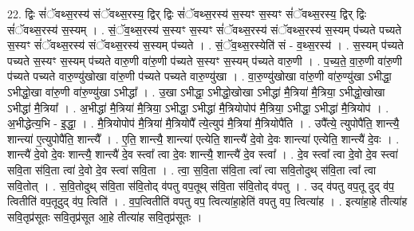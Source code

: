 \documentclass[17pt]{extarticle}
\begin{document}
22. द्विः सं॑ॅवथ्स॒रस्य॑ संॅवथ्स॒रस्य॒ द्विर् द्विः सं॑ॅवथ्स॒रस्य॑ स॒स्यꣳ स॒स्यꣳ सं॑ॅवथ्स॒रस्य॒ द्विर् द्विः सं॑ॅवथ्स॒रस्य॑ स॒स्यम् । . सं॒ॅव॒थ्स॒रस्य॑ स॒स्यꣳ स॒स्यꣳ सं॑ॅवथ्स॒रस्य॑ संॅवथ्स॒रस्य॑ स॒स्यम् प॑च्यते पच्यते स॒स्यꣳ सं॑ॅवथ्स॒रस्य॑ संॅवथ्स॒रस्य॑ स॒स्यम् प॑च्यते । . सं॒ॅव॒थ्स॒रस्येति॑ सं - व॒थ्स॒रस्य॑ । . स॒स्यम् प॑च्यते पच्यते स॒स्यꣳ स॒स्यम् प॑च्यते वारु॒णी वा॑रु॒णी प॑च्यते स॒स्यꣳ स॒स्यम् प॑च्यते वारु॒णी । . प॒च्य॒ते॒ वा॒रु॒णी वा॑रु॒णी प॑च्यते पच्यते वारु॒ण्यु॑खोखा वा॑रु॒णी प॑च्यते पच्यते वारु॒ण्यु॑खा । . वा॒रु॒ण्यु॑खोखा वा॑रु॒णी वा॑रु॒ण्यु॑खा ऽभीद्धा॒ ऽभीद्धो॒खा वा॑रु॒णी वा॑रु॒ण्यु॑खा ऽभीद्धा᳚ । . उ॒खा ऽभीद्धा॒ ऽभीद्धो॒खोखा ऽभीद्धा॑ मै॒त्रिया॑ मै॒त्रिया॒ ऽभीद्धो॒खोखा ऽभीद्धा॑ मै॒त्रिया᳚ । . अ॒भीद्धा॑ मै॒त्रिया॑ मै॒त्रिया॒ ऽभीद्धा॒ ऽभीद्धा॑ मै॒त्रियोपोप॑ मै॒त्रिया॒ ऽभीद्धा॒ ऽभीद्धा॑ मै॒त्रियोप॑ । . अ॒भीद्धेत्य॒भि - इ॒द्धा॒ । . मै॒त्रियोपोप॑ मै॒त्रिया॑ मै॒त्रियोपै᳚ त्ये॒त्युप॑ मै॒त्रिया॑ मै॒त्रियोपै॑ति । . उपै᳚त्ये॒ त्युपोपै॑ति॒ शान्त्यै॒ शान्त्या॑ ए॒त्युपोपै॑ति॒ शान्त्यै᳚ । . ए॒ति॒ शान्त्यै॒ शान्त्या॑ एत्येति॒ शान्त्यै॑ दे॒वो दे॒वः शान्त्या॑ एत्येति॒ शान्त्यै॑ दे॒वः । . शान्त्यै॑ दे॒वो दे॒वः शान्त्यै॒ शान्त्यै॑ दे॒व स्त्वा᳚ त्वा दे॒वः शान्त्यै॒ शान्त्यै॑ दे॒व स्त्वा᳚ । . दे॒व स्त्वा᳚ त्वा दे॒वो दे॒व स्त्वा॑ सवि॒ता स॑वि॒ता त्वा॑ दे॒वो दे॒व स्त्वा॑ सवि॒ता । . त्वा॒ स॒वि॒ता स॑वि॒ता त्वा᳚ त्वा सवि॒तोदुथ् स॑वि॒ता त्वा᳚ त्वा सवि॒तोत् । . स॒वि॒तोदुथ् स॑वि॒ता स॑वि॒तोद् व॑पतु वप॒तूथ् स॑वि॒ता स॑वि॒तोद् व॑पतु । . उद् व॑पतु वप॒तू दुद् व॑प॒ त्वितीति॑ वप॒तूदुद् व॑प॒ त्विति॑ । . व॒प॒त्वितीति॑ वपतु वप॒ त्वित्या॑हा॒हेति॑ वपतु वप॒ त्वित्या॑ह । . इत्या॑हा॒हे तीत्या॑ह सवि॒तृप्र॑सूतः सवि॒तृप्र॑सूत आ॒हे तीत्या॑ह सवि॒तृप्र॑सूतः । \newline
\end{document}
